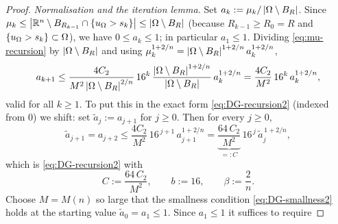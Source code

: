 \begin{proof}
\smallskip
\emph{Normalisation and the iteration lemma.} Set
$a_k:=\mu_k/\left|\Omega\setminus B_R\right|$. Since
$\mu_k\le\left|\mathbb R^n\setminus B_{R_{k-1}}\cap\{u_\Omega>s_k\}\right|
\le\left|\Omega\setminus B_R\right|$ (because $R_{k-1}\ge R_0=R$ and
$\{u_\Omega>s_k\}\subset\Omega$), we have $0\le a_k\le1$; in particular
$a_1\le1$.
Dividing \eqref{eq:mu-recursion} by
$\left|\Omega\setminus B_R\right|$ and using
$\mu_k^{1+2/n}=\left|\Omega\setminus B_R\right|^{1+2/n}a_k^{1+2/n}$,
\[
   a_{k+1}
   \le\frac{4C_2}{M^2\left|\Omega\setminus B_R\right|^{2/n}}\,16^k\,
   \frac{\left|\Omega\setminus B_R\right|^{1+2/n}}{\left|\Omega\setminus B_R\right|}
   \,a_k^{1+2/n}
   =\frac{4C_2}{M^2}\,16^{k}\,a_k^{1+2/n},
\]
valid for all $k\ge1$.
To put this in the exact form
\eqref{eq:DG-recursion2} (indexed from $0$) we shift: set
$\widetilde a_j:=a_{j+1}$ for $j\ge0$. Then for every $j\ge0$,
\[
   \widetilde a_{j+1}=a_{j+2}
   \le\frac{4C_2}{M^2}\,16^{\,j+1}\,a_{j+1}^{1+2/n}
   =\underbrace{\frac{64\,C_2}{M^2}}_{=:C}\,16^{\,j}\,
     \widetilde a_j^{\,1+2/n},
\]
which is \eqref{eq:DG-recursion2} with
\[
   C:=\frac{64\,C_2}{M^2},\qquad b:=16,\qquad\beta:=\frac2n .
\]
Choose $M=M(n)$ so large that the smallness condition
\eqref{eq:DG-smallness2} holds at the starting value
$\widetilde a_0=a_1\le1$. Since $a_1\le1$ it suffices to require

\end{proof}
